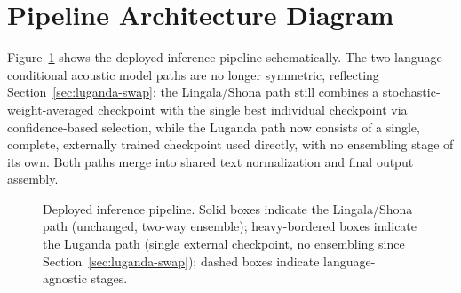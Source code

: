 \documentclass[11pt]{article}
\begin{document}



\clearpage
\appendix
\section{Pipeline Architecture Diagram}

Figure~\ref{fig:pipeline} shows the deployed inference pipeline schematically. The two language-conditional acoustic model paths are no longer symmetric, reflecting Section~\ref{sec:luganda-swap}: the Lingala/Shona path still combines a stochastic-weight-averaged checkpoint with the single best individual checkpoint via confidence-based selection, while the Luganda path now consists of a single, complete, externally trained checkpoint used directly, with no ensembling stage of its own. Both paths merge into shared text normalization and final output assembly.

\begin{figure}[htbp]
\centering
{}
\caption{Deployed inference pipeline. Solid boxes indicate the Lingala/Shona path (unchanged, two-way ensemble); heavy-bordered boxes indicate the Luganda path (single external checkpoint, no ensembling since Section~\ref{sec:luganda-swap}); dashed boxes indicate language-agnostic stages.}
\label{fig:pipeline}
\end{figure}
\end{document}

